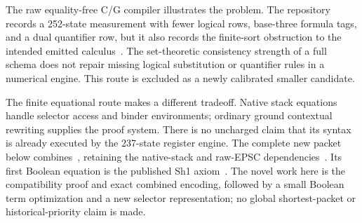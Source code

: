 The raw equality-free C/G compiler illustrates the problem.
The repository records a 252-state measurement with fewer
logical rows, base-three formula tags, and a dual quantifier
row, but it also records the finite-sort obstruction to the
intended emitted calculus~\cite{eqfree}.  The set-theoretic
consistency strength of a full schema does not repair missing
logical substitution or quantifier rules in a numerical engine.
This route is excluded as a newly calibrated smaller candidate.

The finite equational route makes a different tradeoff.  Native
stack equations handle selector access and binder environments;
ordinary ground contextual rewriting supplies the proof system.
There is no uncharged claim that its syntax is already executed
by the 237-state register engine.  The complete new packet below
combines~\cite{e713,e937}, retaining the native-stack and raw-EPSC
dependencies~\cite{source79,epsc}.  Its first Boolean equation is
the published Sh1 axiom~\cite{sh1}.  The novel work here is the
compatibility proof and exact combined encoding, followed by a
small Boolean term optimization and a new selector representation;
no global shortest-packet or
historical-priority claim is made.
